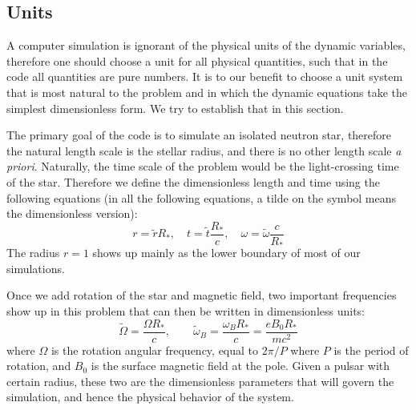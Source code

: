 \subsection{Units}
\label{sec:pic-units}

A computer simulation is ignorant of the physical units of the dynamic
variables, therefore one should choose a unit for all physical quantities, such
that in the code all quantities are pure numbers. It is to our benefit to choose
a unit system that is most natural to the problem and in which the dynamic
equations take the simplest dimensionless form. We try to establish that in this
section.

The primary goal of the code is to simulate an isolated neutron star, therefore
the natural length scale is the stellar radius, and there is no other length
scale {\it a priori}. Naturally, the time scale of the problem would be the
light-crossing time of the star. Therefore we define the dimensionless length
and time using the following equations (in all the following equations, a tilde
on the symbol means the dimensionless version):
\begin{equation}
  r = \tilde{r}R_{*},\quad t = \tilde{t}\frac{R_{*}}{c},\quad \omega = \tilde{\omega}\frac{c}{R_{*}}
\end{equation}
The radius $r = 1$ shows up mainly as the lower boundary of most of our
simulations.

Once we add rotation of the star and magnetic field, two important frequencies
show up in this problem that can then be written in dimensionless units:
\begin{equation}
  \tilde{\Omega} = \frac{\Omega R_{*}}{c},\qquad \tilde{\omega}_B = \frac{\omega_BR_{*}}{c} = \frac{e B_0R_{*}}{mc^2}
\end{equation}
where $\Omega$ is the rotation angular frequency, equal to $2\pi / P$ where $P$ is the period of rotation, and $B_0$ is the surface magnetic field at the pole. Given a pulsar with certain radius, these two are the dimensionless parameters that will govern the simulation, and hence the physical behavior of the system.

